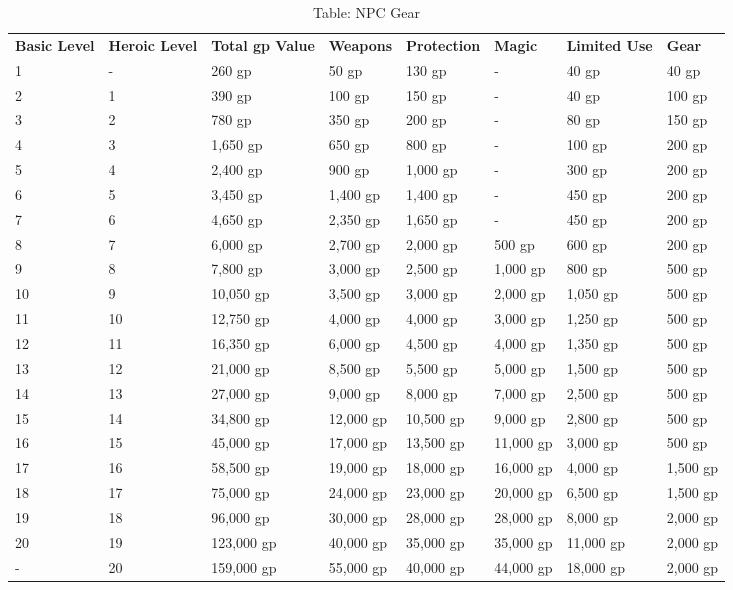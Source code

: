 \begin{table}[]
\sffamily
\caption{Table: NPC Gear}
\begin{tabular}{llllllll}
\textbf{Basic Level} & \textbf{Heroic Level} & \textbf{Total gp Value} & \textbf{Weapons} & \textbf{Protection} & \textbf{Magic} & \textbf{Limited Use} & \textbf{Gear}\\
1 & - & 260 gp & 50 gp & 130 gp & - & 40 gp & 40 gp \\
 2 & 1 & 390 gp & 100 gp & 150 gp & - & 40 gp & 100 gp \\
 3 & 2 & 780 gp & 350 gp & 200 gp & - & 80 gp & 150 gp \\
 4 & 3 & 1,650 gp & 650 gp & 800 gp & - & 100 gp & 200 gp \\
 5 & 4 & 2,400 gp & 900 gp & 1,000 gp & - & 300 gp & 200 gp \\
 6 & 5 & 3,450 gp & 1,400 gp & 1,400 gp & - & 450 gp & 200 gp \\
 7 & 6 & 4,650 gp & 2,350 gp & 1,650 gp & - & 450 gp & 200 gp \\
 8 & 7 & 6,000 gp & 2,700 gp & 2,000 gp & 500 gp & 600 gp & 200 gp \\
 9 & 8 & 7,800 gp & 3,000 gp & 2,500 gp & 1,000 gp & 800 gp & 500 gp \\
 10 & 9 & 10,050 gp & 3,500 gp & 3,000 gp & 2,000 gp & 1,050 gp & 500 gp \\
 11 & 10 & 12,750 gp & 4,000 gp & 4,000 gp & 3,000 gp & 1,250 gp & 500 gp \\
 12 & 11 & 16,350 gp & 6,000 gp & 4,500 gp & 4,000 gp & 1,350 gp & 500 gp \\
 13 & 12 & 21,000 gp & 8,500 gp & 5,500 gp & 5,000 gp & 1,500 gp & 500 gp \\
 14 & 13 & 27,000 gp & 9,000 gp & 8,000 gp & 7,000 gp & 2,500 gp & 500 gp \\
 15 & 14 & 34,800 gp & 12,000 gp & 10,500 gp & 9,000 gp & 2,800 gp & 500 gp \\
 16 & 15 & 45,000 gp & 17,000 gp & 13,500 gp & 11,000 gp & 3,000 gp & 500 gp \\
 17 & 16 & 58,500 gp & 19,000 gp & 18,000 gp & 16,000 gp & 4,000 gp & 1,500 gp \\
 18 & 17 & 75,000 gp & 24,000 gp & 23,000 gp & 20,000 gp & 6,500 gp & 1,500 gp \\
 19 & 18 & 96,000 gp & 30,000 gp & 28,000 gp & 28,000 gp & 8,000 gp & 2,000 gp \\
 20 & 19 & 123,000 gp & 40,000 gp & 35,000 gp & 35,000 gp & 11,000 gp & 2,000 gp \\
 - & 20 & 159,000 gp & 55,000 gp & 40,000 gp & 44,000 gp & 18,000 gp & 2,000 gp\\
\end{tabular}
\end{table}
			
